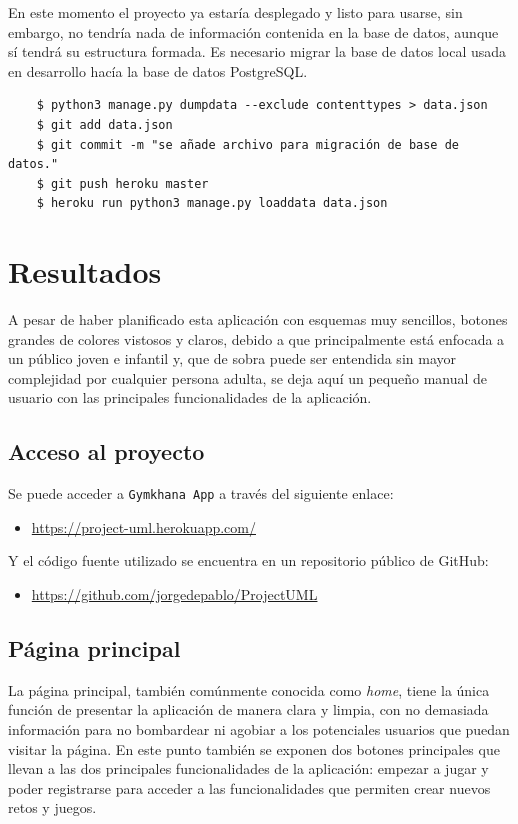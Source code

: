 \documentclass[a4paper, 12pt]{book}
\begin{document}
En este momento el proyecto ya estaría desplegado y listo para usarse, sin embargo, no tendría nada de información contenida en la base de datos, aunque sí tendrá su estructura formada. Es necesario migrar la base de datos local usada en desarrollo hacía la base de datos PostgreSQL.
\begin{verbatim}
	$ python3 manage.py dumpdata --exclude contenttypes > data.json
	$ git add data.json
	$ git commit -m "se añade archivo para migración de base de datos."
	$ git push heroku master
	$ heroku run python3 manage.py loaddata data.json
\end{verbatim}





\cleardoublepage
\chapter{Resultados}
\label{chap:resultados}

A pesar de haber planificado esta aplicación con esquemas muy sencillos, botones grandes de colores vistosos y claros, debido a que principalmente está enfocada a un público joven e infantil y, que de sobra puede ser entendida sin mayor complejidad por cualquier persona adulta, se deja aquí un pequeño manual de usuario con las principales funcionalidades de la aplicación.

\section{Acceso al proyecto}

Se puede acceder a \texttt{Gymkhana App} a través del siguiente enlace: 
\begin{itemize}
	\item \url{https://project-uml.herokuapp.com/}
\end{itemize}
Y el código fuente utilizado se encuentra en un repositorio público de GitHub: 
\begin{itemize}
	\item \url{https://github.com/jorgedepablo/ProjectUML}
\end{itemize}

\section{Página principal}
La página principal, también comúnmente conocida como \emph{home}, tiene la única función de presentar la aplicación de manera clara y limpia, con no demasiada información para no bombardear ni agobiar a los potenciales usuarios que puedan visitar la página. En este punto también se exponen dos botones principales que llevan a las dos principales funcionalidades de la aplicación: empezar a jugar y poder registrarse para acceder a las funcionalidades que permiten crear nuevos retos y juegos. 
\end{document}
